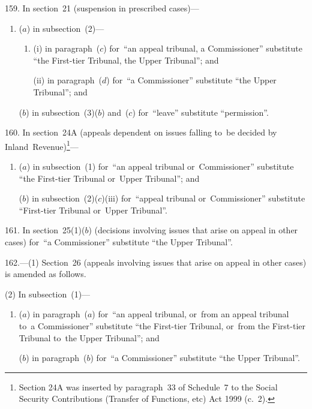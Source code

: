 \documentclass[12pt,a4paper]{article}
\begin{document}
\medskip

159.  In section~21 (suspension in prescribed cases)—
\begin{enumerate}\item[]
($a$) in subsection~(2)—
\begin{enumerate}\item[]
(i) in paragraph~($c$)  for~“an appeal tribunal, a Commissioner” substitute “the First-tier Tribunal, the Upper Tribunal”; and

(ii) in paragraph~($d$)  for~“a Commissioner” substitute “the Upper Tribunal”; and
\end{enumerate}

($b$) in subsection~(3)($b$)  and~($c$)  for~“leave” substitute “permission”.
\end{enumerate}

\medskip

160.  In section~24A (appeals dependent on issues falling to~be decided by Inland~Revenue)\footnote{Section 24A was inserted by paragraph~33 of Schedule~7 to the Social Security Contributions (Transfer of Functions, etc) Act 1999 (c.~2).}—
\begin{enumerate}\item[]
($a$) in subsection~(1) for~“an appeal tribunal or~Commissioner” substitute “the First-tier Tribunal or~Upper Tribunal”; and

($b$) in subsection~(2)($c$)(iii)  for~“appeal tribunal or~Commissioner” substitute “First-tier Tribunal or~Upper Tribunal”.
\end{enumerate}

\medskip

161.  In section~25(1)($b$)  (decisions involving issues that arise on appeal in other cases) for~“a Commissioner” substitute “the Upper Tribunal”.

\medskip

162.---(1)  Section~26 (appeals involving issues that arise on appeal in other cases) is amended as follows.

(2) In subsection~(1)—
\begin{enumerate}\item[]
($a$) in paragraph~($a$)  for~“an appeal tribunal, or~from an appeal tribunal to~a Commissioner” substitute “the First-tier Tribunal, or~from the First-tier Tribunal to~the Upper Tribunal”; and

($b$) in paragraph~($b$)  for~“a Commissioner” substitute “the Upper Tribunal”.
\end{enumerate}
\end{document}
